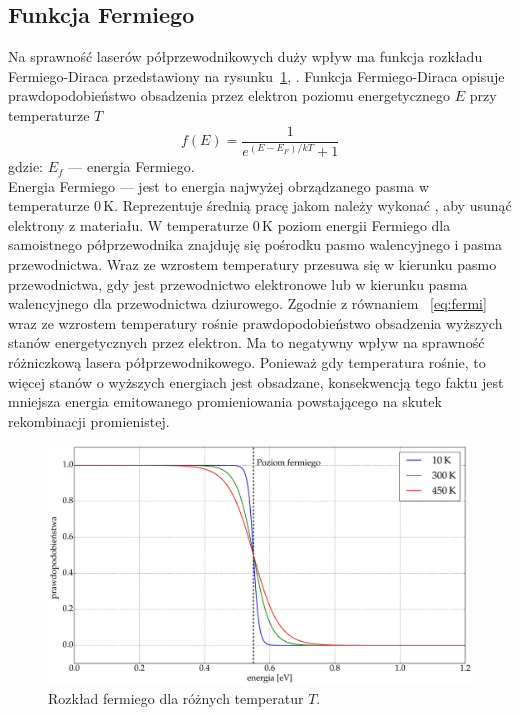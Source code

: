 \subsection{Funkcja Fermiego}
Na sprawność laserów półprzewodnikowych duży wpływ ma funkcja rozkładu Fermiego-Diraca przedstawiony na rysunku~\ref{fig:teoria_rys_3},
. Funkcja Fermiego-Diraca opisuje prawdopodobieństwo obsadzenia przez elektron poziomu
energetycznego $E$ przy temperaturze $T$
\begin{equation}
\label{eq:fermi}
f(E) = \frac{1}{e^{(E-E_F)/kT} + 1}
\end{equation}
gdzie: $E_f$ --- energia Fermiego. \\
Energia Fermiego --- jest to energia najwyżej obrządzanego pasma w temperaturze 0\,K. Reprezentuje średnią pracę jakom należy wykonać
, aby usunąć elektrony z materiału. W temperaturze 0\,K poziom energii Fermiego dla samoistnego półprzewodnika znajduję się pośrodku pasmo walencyjnego i
pasma przewodnictwa. Wraz ze wzrostem temperatury przesuwa się w kierunku pasmo przewodnictwa, gdy jest przewodnictwo elektronowe lub
w kierunku pasma walencyjnego dla przewodnictwa dziurowego.
Zgodnie z równaniem ~\ref{eq:fermi} wraz ze wzrostem temperatury rośnie prawdopodobieństwo obsadzenia wyższych stanów energetycznych przez elektron. Ma to
negatywny wpływ na sprawność różniczkową lasera półprzewodnikowego. Ponieważ gdy temperatura rośnie, to więcej stanów o
wyższych energiach jest obsadzane, konsekwencją tego faktu jest mniejsza energia emitowanego promieniowania powstającego na
skutek rekombinacji promienistej.
\begin{figure}[H]
\center
  \includegraphics[scale=0.25]{fermi.eps}
  \caption{Rozkład fermiego dla różnych temperatur $T$.}
  \label{fig:teoria_rys_3}
\end{figure}
